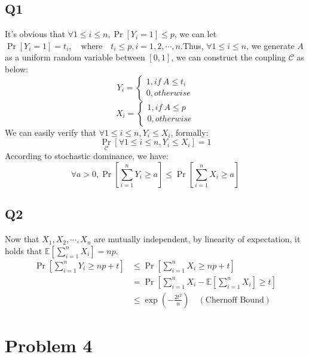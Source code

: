 \documentclass[a4paper, 12pt, titlepage]{article}
\begin{document}
\subsection{Q1}
It's obvious that $\forall 1 \leq i \leq n, \Pr \left[ Y_{i} = 1 \right] \leq p $, we can let $\Pr \left[ Y_{i} = 1 \right] = t_{i}, \quad \text{where} \quad t_{i} \leq p, i = 1, 2, \cdots, n$.Thus, $\forall 1 \leq i \leq n$, we generate $A$ as a uniform random variable between $\left[ 0, 1 \right]$, we can construct the
coupling $\mathcal{C}$ as below:
\[
    Y_{i} = \begin{cases}
        1, if \ A \leq t_{i} \\
        0, otherwise
    \end{cases}  
\]
\[
    X_{i} = \begin{cases}
        1, if \ A \leq p \\
        0, otherwise
    \end{cases}  
\]
We can easily verify that $\forall 1 \leq i \leq n, Y_{i} \leq X_{i}$, formally:
\[
    \Pr_{\mathcal{C}} \left[ \forall 1 \leq i \leq n, Y_{i} \leq X_{i} \right] = 1
\]
According to stochastic dominance, we have:
\[
    \forall a > 0, \Pr \left[ \sum_{i = 1}^{n} Y_{i} \geq a \right] \leq \Pr \left[ \sum_{i = 1}^{n} X_{i} \geq a \right] 
\]

\subsection{Q2}
Now that $X_{1}, X_{2}, \cdots, X_{n}$ are mutually independent, by linearity of expectation, it holds that $\mathbb E \left[ \sum_{i = 1}^{n} X_{i} \right] = np$.
\begin{equation}
    \begin{aligned}
        \Pr \left[ \sum_{i = 1}^{n} Y_{i} \geq np + t \right] &\leq  \Pr \left[ \sum_{i = 1}^{n} X_{i} \geq np + t \right] \\
                                                              &= \Pr \left[ \sum_{i = 1}^{n} X_{i} - \mathbb E \left[ \sum_{i = 1}^{n} X_{i} \right] \geq t \right] \\
                                                              &\leq \exp \left( - \frac{2 t^2}{n} \right) \quad (\text{Chernoff Bound})
    \end{aligned}
\end{equation}

\section{Problem 4}
\end{document}
